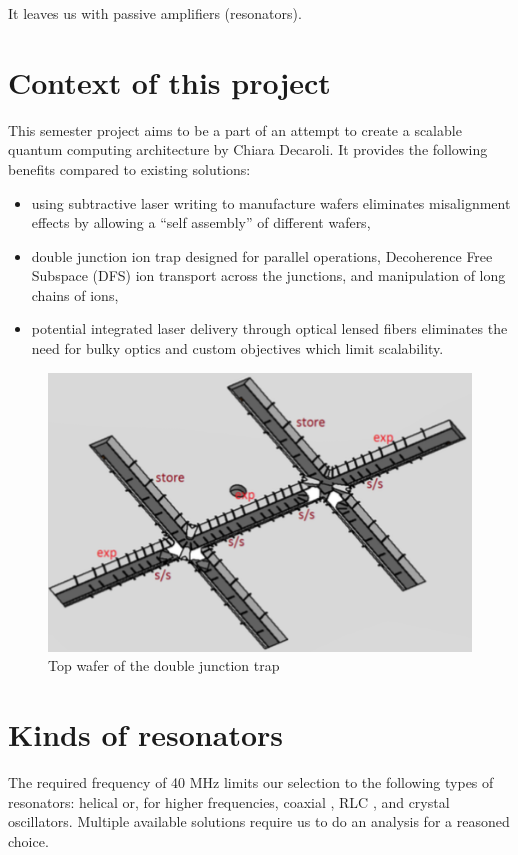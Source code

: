 It leaves us with passive amplifiers (resonators).
\section{Context of this project}
\label{sec:context}
This semester project aims to be a part of an attempt to create a scalable quantum computing architecture by Chiara Decaroli. It provides the following benefits compared to existing solutions:
\begin{itemize}
	\item using subtractive laser writing to manufacture wafers eliminates misalignment effects by allowing a ``self assembly'' of different wafers,
	\item double junction ion trap designed for parallel operations, Decoherence Free Subspace (DFS) ion transport across the junctions, and manipulation of long chains of ions,
	\item potential integrated laser delivery through optical lensed fibers eliminates the need for bulky optics and custom objectives which limit scalability.
\end{itemize}

\begin{figure}[h]
	\centering
	\includegraphics[width=.92\textwidth]{images/trap}
	\caption{Top wafer of the double junction trap}
\end{figure}

\section{Kinds of resonators}
\label{sec:kinds_resonators}
The required frequency of 40 MHz limits our selection to the following types of resonators: helical \cite{Gulde2017, Johnson2016, VanRynbach2016, Kassa2016, Kassa2017} or, for higher frequencies, coaxial \cite{Karin2012}, RLC \cite{Gandolfi2010, Kumph2015, Greene2016}, and crystal oscillators. Multiple available solutions require us to do an analysis for a reasoned choice.
